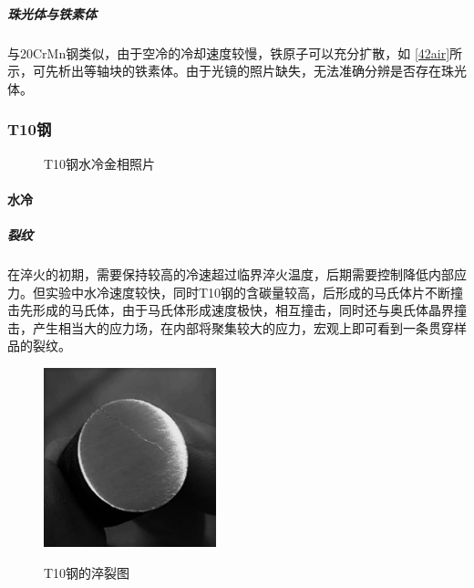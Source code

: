 \documentclass[12pt]{ctexart}
\begin{document}
\subparagraph{珠光体与铁素体}
与20CrMn钢类似，由于空冷的冷却速度较慢，铁原子可以充分扩散，如 \ref{42air}所示，可先析出等轴块的铁素体。由于光镜的照片缺失，无法准确分辨是否存在珠光体。
\subsubsection{T10钢}
\begin{figure}[h]
  \centering
  \caption{T10钢水冷金相照片}
  \label{10water}
\end{figure}
\paragraph{水冷}
\subparagraph{裂纹}
在淬火的初期，需要保持较高的冷速超过临界淬火温度，后期需要控制降低内部应力。但实验中水冷速度较快，同时T10钢的含碳量较高，后形成的马氏体片不断撞击先形成的马氏体，由于马氏体形成速度极快，相互撞击，同时还与奥氏体晶界撞击，产生相当大的应力场，在内部将聚集较大的应力，宏观上即可看到一条贯穿样品的裂纹。
\begin{figure}[h]
  \centering
  \includegraphics[width=5cm]{cuilie.jpg}\\
  \caption{T10钢的淬裂图}\label{cuilie}
\end{figure}
\end{document}
